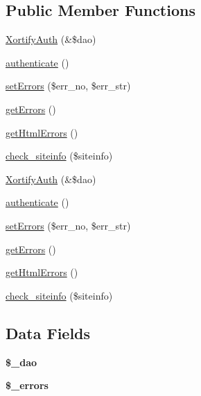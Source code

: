 \subsection*{Public Member Functions}
\begin{DoxyCompactItemize}
\item 
\hyperlink{class_xortify_auth_a726d2829d96759ca86f62e9990b10a15}{Xortify\-Auth} (\&\$dao)
\item 
\hyperlink{class_xortify_auth_a750c93a7dfab5314f2bf662a407bc5a6}{authenticate} ()
\item 
\hyperlink{class_xortify_auth_a84268a33f3ed3114bd0b08404e48893f}{set\-Errors} (\$err\-\_\-no, \$err\-\_\-str)
\item 
\hyperlink{class_xortify_auth_a6e548ebf2656742bfd19939ead923ed2}{get\-Errors} ()
\item 
\hyperlink{class_xortify_auth_a10ee66ee5b086b4e6692174531af900e}{get\-Html\-Errors} ()
\item 
\hyperlink{class_xortify_auth_a9d67d9bde367762a7a27e279e3cfcdf3}{check\-\_\-siteinfo} (\$siteinfo)
\item 
\hyperlink{class_xortify_auth_a726d2829d96759ca86f62e9990b10a15}{Xortify\-Auth} (\&\$dao)
\item 
\hyperlink{class_xortify_auth_a750c93a7dfab5314f2bf662a407bc5a6}{authenticate} ()
\item 
\hyperlink{class_xortify_auth_a84268a33f3ed3114bd0b08404e48893f}{set\-Errors} (\$err\-\_\-no, \$err\-\_\-str)
\item 
\hyperlink{class_xortify_auth_a6e548ebf2656742bfd19939ead923ed2}{get\-Errors} ()
\item 
\hyperlink{class_xortify_auth_a10ee66ee5b086b4e6692174531af900e}{get\-Html\-Errors} ()
\item 
\hyperlink{class_xortify_auth_a9d67d9bde367762a7a27e279e3cfcdf3}{check\-\_\-siteinfo} (\$siteinfo)
\end{DoxyCompactItemize}
\subsection*{Data Fields}
\begin{DoxyCompactItemize}
\item 
\hypertarget{class_xortify_auth_a12a029c610f699b4b25e79a1f64a3485}{{\bfseries \$\-\_\-dao}}\label{class_xortify_auth_a12a029c610f699b4b25e79a1f64a3485}

\item 
\hypertarget{class_xortify_auth_a09272cb16edd572f760a622f37cee6d1}{{\bfseries \$\-\_\-errors}}\label{class_xortify_auth_a09272cb16edd572f760a622f37cee6d1}

\end{DoxyCompactItemize}


